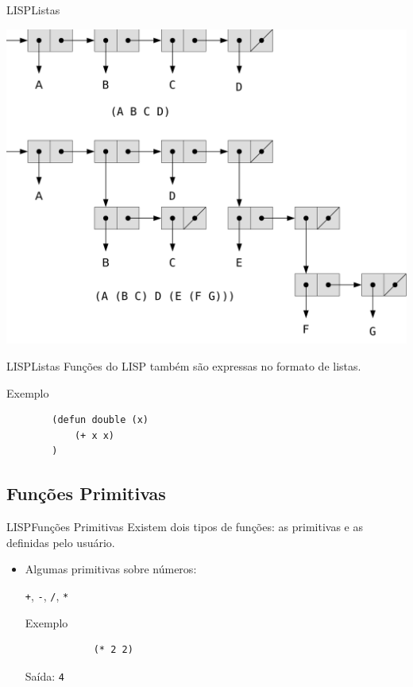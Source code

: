 \documentclass[12pt]{beamer} %
\begin{document}
\begin{frame}{LISP}{Listas}
	\begin{center}
	\includegraphics[scale=.4]{../listas.pdf}
	\end{center}
\end{frame}

\begin{frame}[fragile]{LISP}{Listas}
	Funções do LISP também são expressas no formato de listas.\\[\baselineskip]

	\begin{block}{Exemplo}
		\begin{verbatim}
		(defun double (x)
		    (+ x x)
		)
		\end{verbatim}
	\end{block}
\end{frame}

\subsection{Funções Primitivas}

\begin{frame}[fragile]{LISP}{Funções Primitivas}
	Existem dois tipos de funções: as primitivas e as definidas pelo usuário.

	\begin{itemize}
		\item Algumas primitivas sobre números:

		\texttt{+}, \texttt{-}, \texttt{/}, \texttt{*}\\[\baselineskip]

		\begin{block}{Exemplo}
			\begin{verbatim}
			(* 2 2)
			\end{verbatim}
			Saída: \texttt{4}
		\end{block}

	\end{itemize}
\end{frame}
\end{document}
